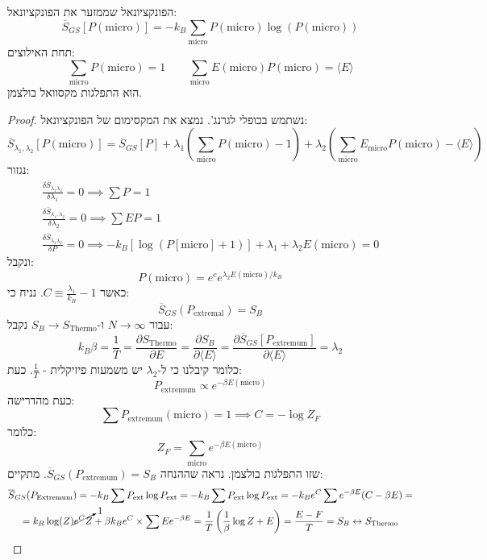 \documentclass{tstextbook}
\begin{document}
\begin{proposition}
הפונקציונאל שממזער את הפונקציונאל:
$$\overline{S} _{GS}[P(\text{micro})]=-k_{B}\sum_{\text{micro}}P(\text{micro})\log(P(\text{micro}))$$
תחת האילוצים:
$$\sum_{\text{micro}}P(\text{micro})=1\qquad \sum_{\text{micro}}E(\text{micro})P(\text{micro})=\langle E \rangle$$
הוא התפלגות מקסוואל בולצמן.

\end{proposition}
\begin{proof}
נשתמש בכופלי לגרנג'. נמצא את המקסימום של הפונקציונאל:
$$\overline{S} _{\lambda_{1},\lambda_{2}}[P(\text{micro})]=\overline{S} _{GS}[P]+\lambda_{1}\left( \sum_{\text{micro}}P(\text{micro})-1 \right)+\lambda_{2}\left( \sum_{\text{micro}}E_{\text{micro}}P(\text{micro})-\langle E \rangle  \right)$$
נגזור:
\begin{gather*}\frac{\delta \overline{S}_{\lambda_{1}\lambda_{2}} }{\delta \lambda_{1}}=0\implies \sum P = 1 \\\frac{\delta \overline{S}_{\lambda_{1},\lambda_{2}}}{\delta \lambda_{2}}=0\implies \sum EP = 1 \\\frac{\delta \overline{S}_{\lambda_{1}\lambda_{2}}}{\delta P}=0\implies -k_{B}[\log(P[\text{micro}]+1)]+\lambda_{1}+\lambda_{2}E(\text{micro})=0 
\end{gather*}
ונקבל:
$$P(\text{micro})=e^{ c }e^{ \lambda_{2}E(\text{micro})/k_{B} }$$
כאשר \(C\equiv \frac{\lambda_{1}}{k_{B}}-1\). נניח כי:
$$\overline{S} _{GS}(P_{\text{extremal}})=S_{B}$$
עבור \(N\to \infty\) ו-\(S_{B}\to S_{\text{Thermo}}\) נקבל:
$$k_{B}\beta=\frac{1}{T} = \frac{\partial S_{\text{Thermo}}}{\partial E}=\frac{\partial S_{B}}{\partial \langle E \rangle }=\frac{\partial \overline{S}_{GS}[P_{\text{extremum}}]}{\partial \langle E \rangle }=\lambda_{2}$$
כלומר קיבלנו כי ל-\(\lambda_{2}\) יש משמעות פיזיקלית - \(\frac{1}{T}\). כעת:
$$P_{\text{extremum}}\propto e^{ -\beta E(\text{micro}) }$$
כעת מהדרישה:
$$\sum P_{\text{extremum}}(\text{micro})=1\implies C=-\log Z_{F}$$
כלומר:
$$Z_{F}=\sum_{\text{micro}}e^{ -\beta E(\text{micro}) }$$
שזו התפלגות בולצמן. נראה שההנחה \(\overline{S}_{GS}(P_{\text{extremum}})=S_{B}\). מתקיים:
\begin{gather*}\overline{S} _{GS}(P_{\text{Extremum}})=-k_{B}\sum P_{\text{ext}}\log P_{\text{ext}}=-k_{B}\sum P_{\text{ext}}\log P_{\text{ext}}=-k_{B}e^{ C }\sum e^{ -\beta E }(C-\beta E)= \\= k_{B}\log (Z )\cancelto{ 1 }{ e^{ C }Z } +\beta k_{B}e^{ C }\times \sum Ee^{ -\beta E }=\frac{1}{T}\left( \frac{1}{\beta}\log Z+E \right)=\frac{E-F}{T}=S_{B}\leftrightarrow  S_{\text{Thermo}}
\end{gather*}

\end{proof}
\end{document}
